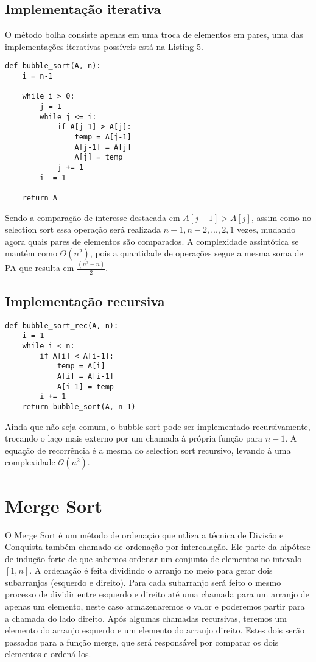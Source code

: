 \documentclass[a4paper, twocolumn]{article}
\theoremstyle{definition}
\begin{document}
\subsection{Implementação iterativa}

O método bolha consiste apenas em uma troca de elementos em pares, uma das implementações iterativas possíveis está na Listing 5.

\begin{lstlisting}[label=bubble_sort,caption= Bubble Sort iterativo]
def bubble_sort(A, n):
    i = n-1
    
    while i > 0:
        j = 1
        while j <= i:
            if A[j-1] > A[j]:
                temp = A[j-1]
                A[j-1] = A[j]
                A[j] = temp
            j += 1
        i -= 1
    
    return A
\end{lstlisting}

Sendo a comparação de interesse destacada em $A[j-1] > A[j]$, assim como no selection sort essa operação será realizada $n-1, n-2, ..., 2, 1$ vezes, mudando agora quais pares de elementos são comparados. A complexidade assintótica se mantém como $\Theta(n^2)$, pois a quantidade de operações segue a mesma soma de PA que resulta em $\frac{(n^2-n)}{2}$.
	
\subsection{Implementação recursiva}

\begin{lstlisting}[label=bubble_sort_rec,caption= Bubble Sort recursivo]
def bubble_sort_rec(A, n):
    i = 1
    while i < n:
        if A[i] < A[i-1]:
            temp = A[i]
            A[i] = A[i-1]
            A[i-1] = temp
        i += 1
    return bubble_sort(A, n-1)
\end{lstlisting}

Ainda que não seja comum, o bubble sort pode ser implementado recursivamente, trocando o laço mais externo por um chamada à própria função para $n-1$. A equação de recorrência é a mesma do selection sort recursivo, levando à uma complexidade $\mathcal{O}(n^2)$.


\section{Merge Sort}
O Merge Sort é um método de ordenação que utliza a técnica de Divisão e Conquista também chamado de ordenação por intercalação. Ele parte da hipótese de indução forte de que sabemos ordenar um conjunto de elementos no intevalo $[1,n]$. A ordenação é feita dividindo o arranjo no meio para gerar dois subarranjos (esquerdo e direito). Para cada subarranjo será feito o mesmo processo de dividir entre esquerdo e direito até uma chamada para um arranjo de apenas um elemento, neste caso armazenaremos o valor e poderemos partir para a chamada do lado direito. Após algumas chamadas recursivas, teremos um elemento do arranjo esquerdo e um elemento do arranjo direito. Estes dois serão passados para a função merge, que será responsável por comparar os dois elementos e ordená-los. 
\end{document}

